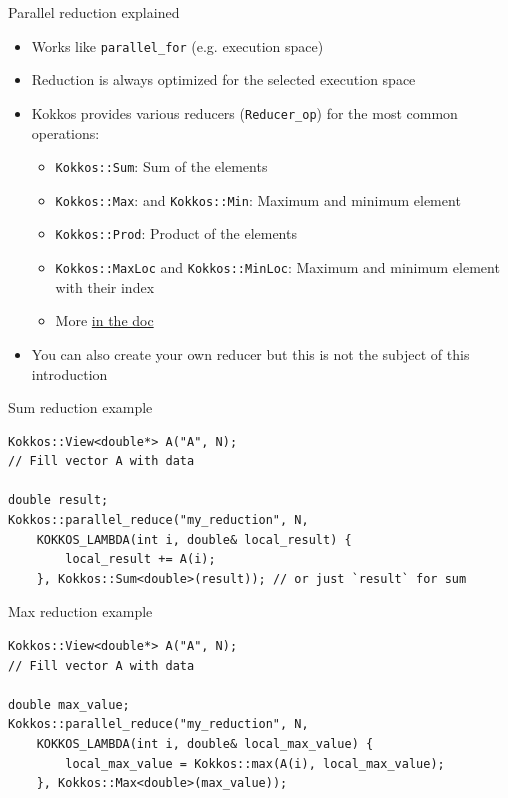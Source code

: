 \documentclass[aspectratio=169]{beamer}
\begin{document}
\begin{frame}{Parallel reduction explained}
    \begin{itemize}
        \item Works like \texttt{parallel\_for} (e.g. execution space)
        \item Reduction is always optimized for the selected execution space
        \item Kokkos provides various reducers (\texttt{Reducer\_op}) for the most common operations:
        \begin{itemize}
            \item \texttt{Kokkos::Sum}: Sum of the elements
            \item \texttt{Kokkos::Max}: and \texttt{Kokkos::Min}: Maximum and minimum element
            \item \texttt{Kokkos::Prod}: Product of the elements
            \item \texttt{Kokkos::MaxLoc} and \texttt{Kokkos::MinLoc}: Maximum and minimum element with their index
            \item More \href{https://kokkos.org/kokkos-core-wiki/ProgrammingGuide/Custom-Reductions-Built-In-Reducers.html}{in the doc}
        \end{itemize}
        \item You can also create your own reducer but this is not the subject of this introduction
    \end{itemize}
\end{frame}


\begin{frame}[fragile]{Sum reduction example}
    \begin{verbatim}
Kokkos::View<double*> A("A", N);
// Fill vector A with data

double result;
Kokkos::parallel_reduce("my_reduction", N,
    KOKKOS_LAMBDA(int i, double& local_result) {
        local_result += A(i);
    }, Kokkos::Sum<double>(result)); // or just `result` for sum
    \end{verbatim}
\end{frame}


\begin{frame}[fragile]{Max reduction example}
    \begin{verbatim}
Kokkos::View<double*> A("A", N);
// Fill vector A with data

double max_value;
Kokkos::parallel_reduce("my_reduction", N,
    KOKKOS_LAMBDA(int i, double& local_max_value) {
        local_max_value = Kokkos::max(A(i), local_max_value);
    }, Kokkos::Max<double>(max_value));
    \end{verbatim}
\end{frame}
\end{document}
